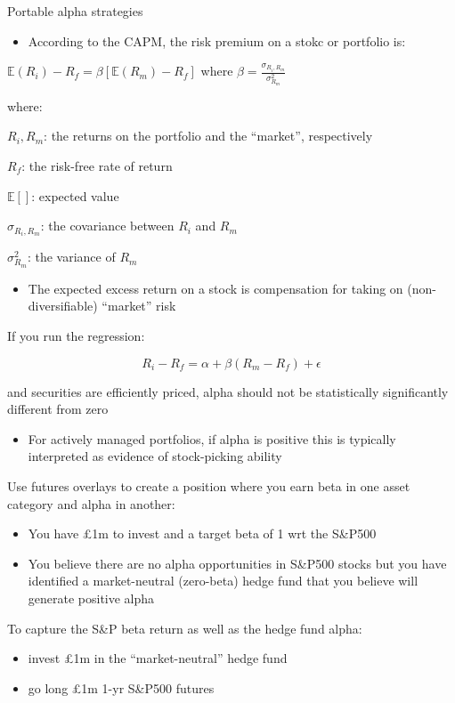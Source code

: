 \documentclass[
  ignorenonframetext,
  aspectratio=169]{beamer}
\providecommand{\tightlist}{%
  \setlength{\itemsep}{0pt}\setlength{\parskip}{0pt}}
\begin{document}
\begin{frame}{Portable alpha strategies}
\protect\hypertarget{portable-alpha-strategies}{}
\begin{itemize}
\tightlist
\item
  According to the CAPM, the risk premium on a stokc or portfolio is:
\end{itemize}

\(\mathbb{E}(R_i) - R_f = \beta[\mathbb{E}(R_m) - R_f]\) where
\(\beta = \frac{\sigma_{R_i,R_m}}{\sigma^2_{R_m}}\)

where:

\(R_i,R_m\): the returns on the portfolio and the ``market'',
respectively

\(R_f\): the risk-free rate of return

\(\mathbb{E}[]\): expected value

\(\sigma_{R_i,R_m}\): the covariance between \(R_i\) and \(R_m\)

\(\sigma^2_{R_m}\): the variance of \(R_m\)

\begin{itemize}
\tightlist
\item
  The expected excess return on a stock is compensation for taking on
  (non-diversifiable) ``market'' risk
\end{itemize}
\end{frame}

\begin{frame}
If you run the regression:

\[
R_i - R_f = \alpha + \beta (R_m - R_f)  + \epsilon
\]

and securities are efficiently priced, alpha should not be statistically
significantly different from zero

\begin{itemize}
\tightlist
\item
  For actively managed portfolios, if alpha is positive this is
  typically interpreted as evidence of stock-picking ability
\end{itemize}
\end{frame}

\begin{frame}
Use futures overlays to create a position where you earn beta in one
asset category and alpha in another:

\begin{itemize}
\tightlist
\item
  You have £1m to invest and a target beta of 1 wrt the S\&P500
\item
  You believe there are no alpha opportunities in S\&P500 stocks but you
  have identified a market-neutral (zero-beta) hedge fund that you
  believe will generate positive alpha
\end{itemize}

To capture the S\&P beta return as well as the hedge fund alpha:

\begin{itemize}
\tightlist
\item
  invest £1m in the ``market-neutral'' hedge fund
\item
  go long £1m 1-yr S\&P500 futures
\end{itemize}
\end{frame}
\end{document}
